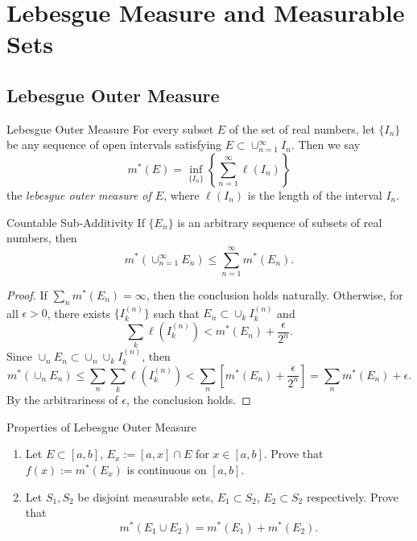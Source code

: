 
\section{Lebesgue Measure and Measurable Sets}

\subsection{Lebesgue Outer Measure}

\begin{definition}{Lebesgue Outer Measure}{}
  For every subset $E$ of the set of real numbers,
  let $\{I_n\}$ be any sequence of open intervals satisfying
  $E \subset \cup _{n = 1}^{\infty} I_n$. Then we say
  \begin{equation}
    m^{\ast} (E) = \inf_{\{I_n\}} \left\{\sum_{n = 1}^{\infty} \ell(I_n)\right\}
  \end{equation}
  the \emph{lebesgue outer measure of $E$},
  where $\ell(I_n)$ is the length of the interval $I_n$.
\end{definition}


\begin{proposition}{Countable Sub-Additivity}{}
  If $\{E_n\}$ is an arbitrary sequence of subsets of real numbers,
  then
  \begin{equation}
    m^{\ast} (\cup _{n = 1}^{\infty} E_n) \leq \sum _{n = 1}^{\infty} m^{\ast}(E_n).
  \end{equation}
\end{proposition}

\begin{proof}
  If $\sum_n m^{\ast}(E_n) = \infty$, then the conclusion holds naturally.
  Otherwise, for all $\epsilon > 0$, there exists $\{I_k^{(n)}\}$ such that
  $E_n \subset \cup_k I_k^{(n)}$ and
  \begin{equation}
    \sum \limits _k \ell(I_k^{(n)}) < m^{\ast}(E_n) + \frac{\epsilon}{2^n}.
  \end{equation}
  Since $\cup _n E_n \subset \cup _n \cup _k I_k^{(n)}$, then
  \begin{equation}
    m^{\ast}(\cup _n E_n)
    \leq \sum _n \sum _k \ell(I_k^{(n)})
    < \sum _n \left[ m^{\ast}(E_n) + \frac{\epsilon}{2^n} \right]
    = \sum _n m^{\ast}(E_n) + \epsilon.
  \end{equation}
  By the arbitrariness of $\epsilon$, the conclusion holds.
\end{proof}

\begin{example}{Properties of Lebesgue Outer Measure}{}
  \begin{enumerate}
  \item Let $E \subset [a, b]$, $E_x := [a, x] \cap E$ for $x \in [a, b]$.
    Prove that $f(x) := m^{\ast}(E_x)$ is continuous on $[a, b]$.
  \item Let $S_1,S_2$ be disjoint measurable sets,
    $E_1 \subset S_2$, $E_2 \subset S_2$ respectively.
    Prove that 
    \begin{equation}
      m^{\ast}(E_1 \cup E_2) = m^{\ast}(E_1) + m^{\ast}(E_2).
    \end{equation}
  \end{enumerate}
\end{example}


